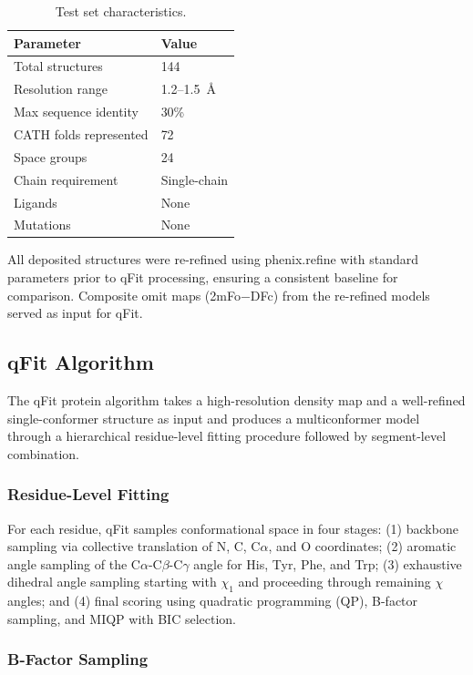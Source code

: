 \documentclass[12pt]{article}
\begin{document}
\begin{table}[ht]
\centering
\caption{Test set characteristics.}
\label{tab:testset}
\begin{tabular}{ll}
\toprule
Parameter & Value \\
\midrule
Total structures & 144 \\
Resolution range & 1.2--1.5~\AA \\
Max sequence identity & 30\% \\
CATH folds represented & 72 \\
Space groups & 24 \\
Chain requirement & Single-chain \\
Ligands & None \\
Mutations & None \\
\bottomrule
\end{tabular}
\end{table}

All deposited structures were re-refined using phenix.refine with standard parameters prior to qFit processing, ensuring a consistent baseline for comparison. Composite omit maps (2mFo$-$DFc) from the re-refined models served as input for qFit.

\subsection{qFit Algorithm}

The qFit protein algorithm takes a high-resolution density map and a well-refined single-conformer structure as input and produces a multiconformer model through a hierarchical residue-level fitting procedure followed by segment-level combination.

\subsubsection{Residue-Level Fitting}

For each residue, qFit samples conformational space in four stages: (1) backbone sampling via collective translation of N, C, C$\alpha$, and O coordinates; (2) aromatic angle sampling of the C$\alpha$-C$\beta$-C$\gamma$ angle for His, Tyr, Phe, and Trp; (3) exhaustive dihedral angle sampling starting with $\chi_1$ and proceeding through remaining $\chi$ angles; and (4) final scoring using quadratic programming (QP), B-factor sampling, and MIQP with BIC selection.

\subsubsection{B-Factor Sampling}
\end{document}
